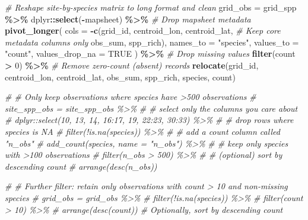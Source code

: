 \documentclass[
]{article}
\newenvironment{Shaded}{\begin{snugshade}}{\end{snugshade}}
\newcommand{\AttributeTok}[1]{\textcolor[rgb]{0.13,0.29,0.53}{#1}}
\newcommand{\CommentTok}[1]{\textcolor[rgb]{0.56,0.35,0.01}{\textit{#1}}}
\newcommand{\ConstantTok}[1]{\textcolor[rgb]{0.56,0.35,0.01}{#1}}
\newcommand{\DecValTok}[1]{\textcolor[rgb]{0.00,0.00,0.81}{#1}}
\newcommand{\FunctionTok}[1]{\textcolor[rgb]{0.13,0.29,0.53}{\textbf{#1}}}
\newcommand{\NormalTok}[1]{#1}
\newcommand{\OtherTok}[1]{\textcolor[rgb]{0.56,0.35,0.01}{#1}}
\newcommand{\SpecialCharTok}[1]{\textcolor[rgb]{0.81,0.36,0.00}{\textbf{#1}}}
\newcommand{\StringTok}[1]{\textcolor[rgb]{0.31,0.60,0.02}{#1}}
\begin{document}
\begin{Shaded}
\begin{Highlighting}[]
\CommentTok{\# Reshape site{-}by{-}species matrix to long format and clean}
\NormalTok{grid\_obs }\OtherTok{=}\NormalTok{ grid\_spp }\SpecialCharTok{\%\textgreater{}\%} 
\NormalTok{  dplyr}\SpecialCharTok{::}\FunctionTok{select}\NormalTok{(}\SpecialCharTok{{-}}\NormalTok{mapsheet) }\SpecialCharTok{\%\textgreater{}\%}                         \CommentTok{\# Drop mapsheet metadata}
  \FunctionTok{pivot\_longer}\NormalTok{(}
    \AttributeTok{cols =} \SpecialCharTok{{-}}\FunctionTok{c}\NormalTok{(grid\_id, centroid\_lon, centroid\_lat,     }\CommentTok{\# Keep core metadata columns only}
\NormalTok{              obs\_sum, spp\_rich),}
    \AttributeTok{names\_to  =} \StringTok{"species"}\NormalTok{,}
    \AttributeTok{values\_to =} \StringTok{"count"}\NormalTok{,}
    \AttributeTok{values\_drop\_na =} \ConstantTok{TRUE}\NormalTok{ ) }\SpecialCharTok{\%\textgreater{}\%}                        \CommentTok{\# Drop missing values}
  \FunctionTok{filter}\NormalTok{(count }\SpecialCharTok{\textgreater{}} \DecValTok{0}\NormalTok{) }\SpecialCharTok{\%\textgreater{}\%}                                \CommentTok{\# Remove zero{-}count (absent) records}
  \FunctionTok{relocate}\NormalTok{(grid\_id, centroid\_lon, centroid\_lat,}
\NormalTok{           obs\_sum, spp\_rich, species, count)}

\CommentTok{\# \# Only keep observations where species have \textgreater{}500 observations}
\CommentTok{\# site\_spp\_obs = site\_spp\_obs \%\textgreater{}\%}
\CommentTok{\#   \# select only the columns you care about}
\CommentTok{\#   dplyr::select(10, 13, 14, 16:17, 19, 22:23, 30:33) \%\textgreater{}\%}
\CommentTok{\#   \# drop rows where species is NA}
\CommentTok{\#   filter(!is.na(species)) \%\textgreater{}\%}
\CommentTok{\#   \# add a count column called "n\_obs"}
\CommentTok{\#   add\_count(species, name = "n\_obs") \%\textgreater{}\%}
\CommentTok{\#   \# keep only species with \textgreater{}100 observations}
\CommentTok{\#   filter(n\_obs \textgreater{} 500) \%\textgreater{}\%}
\CommentTok{\#   \# (optional) sort by descending count}
\CommentTok{\#   arrange(desc(n\_obs))}

\CommentTok{\# \# Further filter: retain only observations with count \textgreater{} 10 and non{-}missing species}
\CommentTok{\# grid\_obs = grid\_obs \%\textgreater{}\%}
\CommentTok{\#   filter(!is.na(species)) \%\textgreater{}\%}
\CommentTok{\#   filter(count \textgreater{} 10) \%\textgreater{}\%}
\CommentTok{\#   arrange(desc(count))                                 \# Optionally, sort by descending count}


\end{Highlighting}
\end{Shaded}
\end{document}
